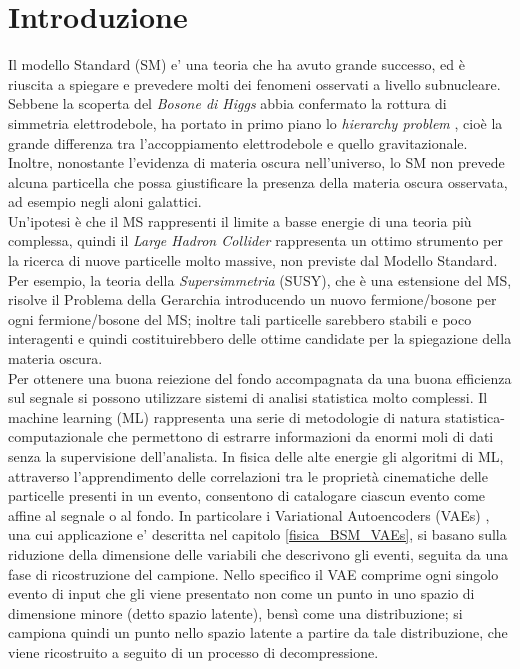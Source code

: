 %
\section{Introduzione}
\label{sec:introduzione}
%
Il modello Standard (SM) e' una teoria che ha avuto grande successo, ed è riuscita a spiegare e prevedere molti dei fenomeni osservati a livello subnucleare. Sebbene la scoperta del \textit{Bosone di Higgs} \cite{Bosone_di_Higgs} abbia confermato la rottura di simmetria elettrodebole, ha portato in primo piano lo \textit{hierarchy problem} \cite{PG1,PG2,PG3,PG4}, cioè la grande differenza tra l'accoppiamento elettrodebole e quello gravitazionale. Inoltre, nonostante l'evidenza di materia oscura nell'universo, lo SM non prevede alcuna particella che possa giustificare la presenza della materia oscura osservata, ad esempio negli aloni galattici. \\
Un'ipotesi è che il MS rappresenti il limite a basse energie di una teoria più complessa, quindi il \textit{Large Hadron Collider} rappresenta un ottimo strumento per la ricerca di nuove particelle molto massive, non previste dal Modello Standard.\\
Per esempio, la teoria della \textit{Supersimmetria} (SUSY), che è una estensione del MS, risolve il Problema della Gerarchia introducendo un nuovo fermione/bosone per ogni fermione/bosone del MS; inoltre tali particelle sarebbero stabili e poco interagenti e quindi costituirebbero delle ottime candidate per la spiegazione della materia oscura. \\
Per ottenere una buona reiezione del fondo accompagnata da una buona efficienza sul segnale si possono utilizzare  sistemi di analisi statistica molto complessi. Il machine learning (ML) rappresenta una serie di metodologie di natura statistica-computazionale che permettono di estrarre informazioni da enormi moli di dati senza la supervisione dell'analista. In fisica delle alte energie gli algoritmi di ML, attraverso l'apprendimento delle correlazioni tra le proprietà cinematiche delle particelle presenti in un evento, consentono di catalogare ciascun evento come affine al segnale o al fondo. In particolare i Variational Autoencoders (VAEs) \cite{Understanding_VAEs}, una cui applicazione e' descritta nel capitolo \ref{fisica_BSM_VAEs}, si basano sulla riduzione della dimensione delle variabili che descrivono gli eventi, seguita da una fase di ricostruzione del campione. Nello specifico il VAE comprime ogni singolo evento di input che gli viene presentato non come un punto in uno spazio di dimensione minore (detto spazio latente), bensì come una distribuzione; si campiona quindi un punto nello spazio latente a partire da tale distribuzione, che viene ricostruito a seguito di un processo di decompressione. \\

